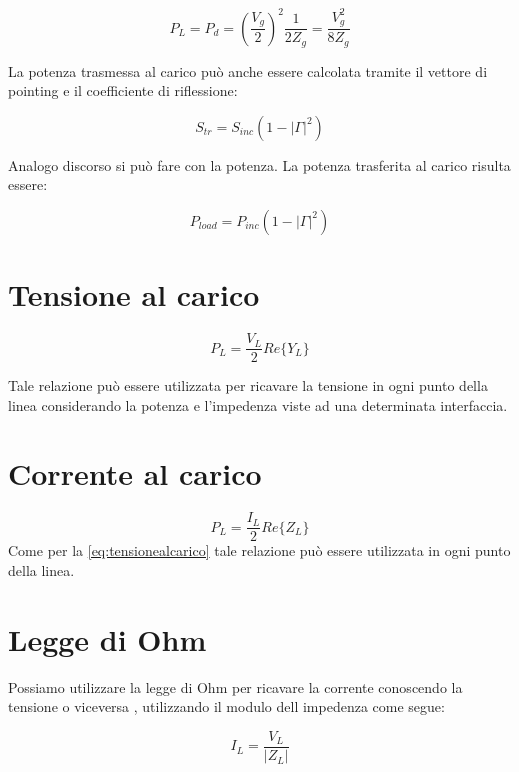 \documentclass[10pt,a4paper]{report}
\begin{document}
			\begin{equation}
			P_L=P_d=(\frac{V_g}{2})^2\frac{1}{2Z_g}=\frac{V_g^2}{8Z_g}
			\end{equation}

			La potenza trasmessa al carico può anche essere calcolata tramite il vettore di pointing e il coefficiente di riflessione:

			\begin{equation}
			S_{tr}=S_{inc}(1-|\Gamma|^2)
			\end{equation}

			Analogo discorso si può fare con la potenza.
			La potenza trasferita al carico risulta essere:

			\begin{equation}
			P_{load}=P_{inc}(1-|\Gamma|^2)
			\end{equation}
	\section{Tensione al carico}

			\begin{equation}
			P_L=\frac{V_{L}}{2}Re\{Y_L\}
			\label{eq:tensionealcarico}
			\end{equation}

			Tale relazione può essere utilizzata per ricavare la tensione in ogni punto della linea considerando la potenza e l'impedenza viste ad una determinata interfaccia.
	\section{Corrente al carico}


			\begin{equation}
			P_L=\frac{I_{L}}{2}Re\{Z_L\}
			\label{eq:correntealcarico}
			\end{equation}
			Come per la \ref{eq:tensionealcarico} tale relazione può essere utilizzata in ogni punto della linea.
	\section{Legge di Ohm}

	Possiamo utilizzare la legge di Ohm per ricavare la corrente conoscendo la tensione o viceversa , utilizzando il modulo dell impedenza come segue:

	\begin{equation}
	I_L=\frac{V_L}{|Z_L|}
	\end{equation}
\end{document}
